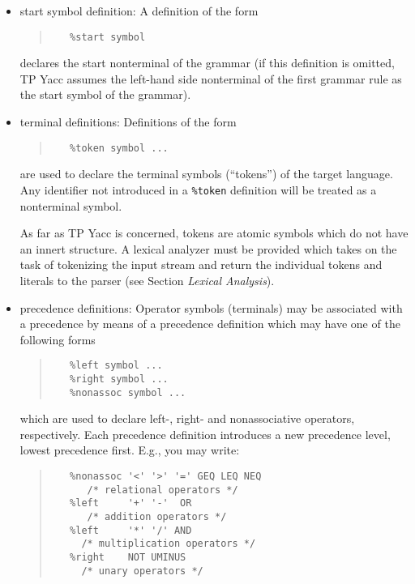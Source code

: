 \begin{itemize}
   \item
      start symbol definition: A definition of the form
      \begin{quote}\begin{verbatim}
   %start symbol
      \end{verbatim}\end{quote}
      declares the start nonterminal of the grammar (if this definition is
      omitted, TP Yacc assumes the left-hand side nonterminal of the first
      grammar rule as the start symbol of the grammar).
   \item
      terminal definitions: Definitions of the form
      \begin{quote}\begin{verbatim}
   %token symbol ...
      \end{verbatim}\end{quote}
      are used to declare the terminal symbols (``tokens'') of the target
      language. Any identifier not introduced in a \verb"%token" definition
      will be treated as a nonterminal symbol.

      As far as TP Yacc is concerned, tokens are atomic symbols which do not
      have an innert structure. A lexical analyzer must be provided which
      takes on the task of tokenizing the input stream and return the
      individual tokens and literals to the parser (see Section {\em Lexical
      Analysis\/}).
   \item
      precedence definitions: Operator symbols (terminals) may be associated
      with a precedence by means of a precedence definition which may have
      one of the following forms
      \begin{quote}\begin{verbatim}
   %left symbol ...
   %right symbol ...
   %nonassoc symbol ...
      \end{verbatim}\end{quote}
      which are used to declare left-, right- and nonassociative operators,
      respectively. Each precedence definition introduces a new precedence
      level, lowest precedence first. E.g., you may write:
      \begin{quote}\begin{verbatim}
   %nonassoc '<' '>' '=' GEQ LEQ NEQ
      /* relational operators */
   %left     '+' '-'  OR
      /* addition operators */
   %left     '*' '/' AND
     /* multiplication operators */
   %right    NOT UMINUS
     /* unary operators */
      \end{verbatim}\end{quote}


\end{itemize}
